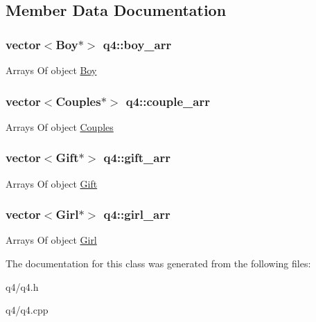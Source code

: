 \subsection{Member Data Documentation}
\hypertarget{classq4_a8116680316b0f74cab38ed2ed3c5eb15}{
\subsubsection[{boy\-\_\-arr}]{\setlength{\rightskip}{0pt plus 5cm}vector$<${\bf Boy}$\ast$$>$ q4\-::boy\-\_\-arr}}\label{classq4_a8116680316b0f74cab38ed2ed3c5eb15}
Arrays Of object \hyperlink{class_boy}{Boy} \hypertarget{classq4_aeeca505da8585ce1cd5fb60bfa0b1b32}{
\subsubsection[{couple\-\_\-arr}]{\setlength{\rightskip}{0pt plus 5cm}vector$<${\bf Couples}$\ast$$>$ q4\-::couple\-\_\-arr}}\label{classq4_aeeca505da8585ce1cd5fb60bfa0b1b32}
Arrays Of object \hyperlink{class_couples}{Couples} \hypertarget{classq4_aec6a9132288aacac38499567bf7010c6}{
\subsubsection[{gift\-\_\-arr}]{\setlength{\rightskip}{0pt plus 5cm}vector$<${\bf Gift}$\ast$$>$ q4\-::gift\-\_\-arr}}\label{classq4_aec6a9132288aacac38499567bf7010c6}
Arrays Of object \hyperlink{class_gift}{Gift} \hypertarget{classq4_aab0777b7f5690bb9c66d4287c54ea948}{
\subsubsection[{girl\-\_\-arr}]{\setlength{\rightskip}{0pt plus 5cm}vector$<${\bf Girl}$\ast$$>$ q4\-::girl\-\_\-arr}}\label{classq4_aab0777b7f5690bb9c66d4287c54ea948}
Arrays Of object \hyperlink{class_girl}{Girl} 

The documentation for this class was generated from the following files\-:\begin{DoxyCompactItemize}
\item 
q4/q4.\-h\item 
q4/q4.\-cpp\end{DoxyCompactItemize}
